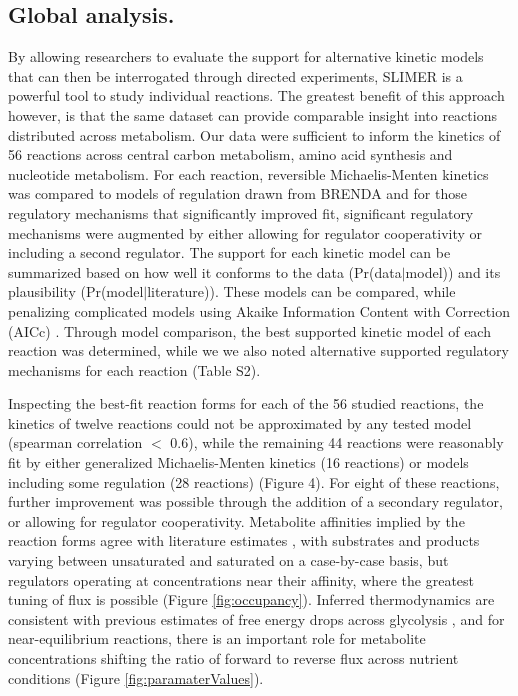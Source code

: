 \subsection{Global analysis.}
 
By allowing researchers to evaluate the support for alternative kinetic models that can then be interrogated through directed experiments, SLIMER is a powerful tool to study individual reactions.  The greatest benefit of this approach however, is that the same dataset can provide comparable insight into reactions distributed across metabolism.  Our data were sufficient to inform the kinetics of 56 reactions across central carbon metabolism, amino acid synthesis and nucleotide metabolism.  For each reaction, reversible Michaelis-Menten kinetics was compared to models of regulation drawn from BRENDA and for those regulatory mechanisms that significantly improved fit, significant regulatory mechanisms were augmented by either allowing for regulator cooperativity or including a second regulator. The support for each kinetic model can be summarized based on how well it conforms to the data (Pr(data$|$model)) and its plausibility (Pr(model$|$literature)).  These models can be compared, while penalizing complicated models using Akaike Information Content with Correction (AICc) \cite{Burnham:2002eq}. Through model comparison, the best supported kinetic model of each reaction was determined, while we we also noted alternative supported regulatory mechanisms for each reaction (Table S2).

Inspecting the best-fit reaction forms for each of the 56 studied reactions, the kinetics of twelve reactions could not be approximated by any tested model (spearman correlation $<$ 0.6), while the remaining 44 reactions were reasonably fit by either generalized Michaelis-Menten kinetics (16 reactions) or models including some regulation (28 reactions) (Figure 4).  For eight of these reactions, further improvement was possible through the addition of a secondary regulator, or allowing for regulator cooperativity.  Metabolite affinities implied by the reaction forms agree with literature estimates \cite{Scheer:2011df}, with substrates and products varying between unsaturated and saturated on a case-by-case basis, but regulators operating at concentrations near their affinity, where the greatest tuning of flux is possible (Figure \ref{fig:occupancy}). Inferred thermodynamics are consistent with previous estimates of free energy drops across glycolysis \cite{Flamholz:2013io}, and for near-equilibrium reactions, there is an important role for metabolite concentrations shifting the ratio of forward to reverse flux across nutrient conditions (Figure \ref{fig:paramaterValues}).

